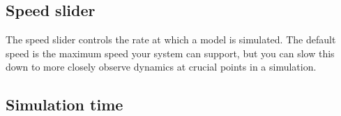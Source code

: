\subsection{Speed slider}

\label{Speedslider}
\begin{center}
\par\end{center}

The speed slider controls the rate at which a model is simulated.
The default speed is the maximum speed your system can support, but
you can slow this down to more closely observe dynamics at crucial
points in a simulation.

\subsection{Simulation time}

\label{SimTime}

